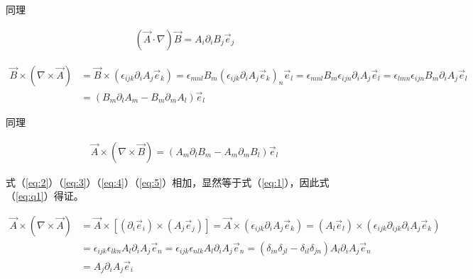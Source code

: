 \documentclass{article}
\begin{document}
同理

\begin{equation}
  \label{eq:3}
  \begin{aligned}
    \left( \vec{A} \cdot \nabla \right) \vec{B} = A_i \partial_i B_j \vec{e}_j
  \end{aligned}
\end{equation}

\begin{equation}
  \label{eq:4}
  \begin{aligned}
    \vec{B} \times \left( \nabla \times \vec{A} \right) &= \vec{B} \times \left( \epsilon_{ijk} \partial_i A_j \vec{e}_k \right) = \epsilon_{mnl} B_m \left( \epsilon_{ijk} \partial_i A_j \vec{e}_k \right)_n \vec{e}_l = \epsilon_{mnl} B_m \epsilon_{ijn} \partial_i A_j \vec{e}_l = \epsilon_{lmn} \epsilon_{ijn} B_m \partial_i A_j \vec{e}_l\\ &= \left( B_m \partial_l A_m - B_m \partial_m A_l \right) \vec{e}_l
  \end{aligned}
\end{equation}

同理

\begin{equation}
  \label{eq:5}
  \begin{aligned}
    \vec{A} \times \left( \nabla \times \vec{B} \right) = \left( A_m \partial_l B_m - A_m \partial_m B_l \right) \vec{e}_l
  \end{aligned}
\end{equation}

式（\ref{eq:2}）（\ref{eq:3}）（\ref{eq:4}）（\ref{eq:5}）相加，显然等于式（\ref{eq:1}），因此式（\ref{eq:q1}）得证。

\begin{equation}
  \label{eq:6}
  \begin{aligned}
    \vec{A} \times \left( \nabla \times \vec{A} \right) &= \vec{A} \times \left[ \left( \partial_i \vec{e}_i \right) \times \left( A_j \vec{e}_j \right) \right] = \vec{A} \times \left( \epsilon_{ijk} \partial_i A_j \vec{e}_k \right) = \left( A_l \vec{e}_l \right) \times \left( \epsilon_{ijk} \partial_{ijk} \partial_i A_j \vec{e}_k \right) \\ &= \epsilon_{ijk} \epsilon_{lkn} A_l \partial_i A_j \vec{e}_n = \epsilon_{ijk} \epsilon_{nlk} A_l \partial_i A_j \vec{e}_n = \left( \delta_{in} \delta_{jl} - \delta_{il} \delta_{jn} \right) A_l \partial_i A_j \vec{e}_n \\ &= A_j \partial_i A_j \vec{e}_i 
  \end{aligned}
\end{equation}
\end{document}
